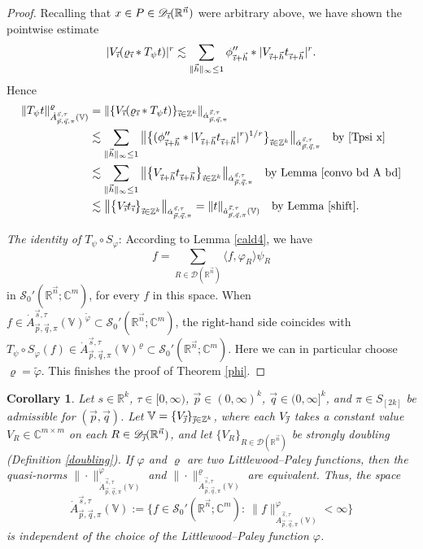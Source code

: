 \documentclass[11pt, reqno]{amsart}
\newtheorem{corollary}[theorem]{Corollary}
\theoremstyle{definition}
\theoremstyle{remark}
\numberwithin{equation}{section}
\newcommand{\C}{\mathbb C}
\newcommand{\D}{\mathscr D}
\newcommand{\R}{\mathbb R}
\newcommand{\Sc}{\mathscr S}
\newcommand{\V}{\mathbb V}
\newcommand{\Z}{\mathbb Z}
\newcommand{\vh}{\vec h}
\newcommand{\vi}{\vec{\textit{\i}}}
\newcommand{\vj}{\vec{\textit{\j}}}
\newcommand{\vn}{\vec n}
\newcommand{\vp}{\vec p}
\newcommand{\vq}{\vec q}
\newcommand{\vs}{\vec s}
\newcommand{\Atau}{\dot A^{\vs,\tau}_{\vp,\vq,\pi}}
\newcommand{\atau}{\dot a^{\vs,\tau}_{\vp,\vq,\pi}}
\newcommand{\aatau}{\dot{\alpha}^{\vs,\tau}_{\vp,\vq,\pi}}
\newcommand{\pair}[2]{\langle #1, #2 \rangle}
\newcommand{\abs}[1]{|#1|}
\newcommand{\Norm}[2]{\|#1\|_{#2}}
\newcommand{\bNorm}[2]{\big\|#1\big\|_{#2}}
\begin{document}
\begin{proof}
Recalling that $x\in P\in\D_{\vi}(\R^{\vn})$ were arbitrary above, we have shown the pointwise estimate
\begin{equation}\label{Tpsi x}
\abs{V_{\vi}(\varrho_{\vi}*T_\psi t)}^r
\lesssim\sum_{\Norm{\vh}{\infty}\leq 1}\phi_{\vi+\vh}''*\abs{V_{\vi+\vh}t_{\vi+\vh}}^r.
\end{equation}
Hence
\begin{align*}
\Norm{T_\psi t}{\Atau(\V)}^{\varrho}
&=\Norm{\{V_{\vi}(\varrho_{\vi}*T_\psi t)\}_{\vi\in\Z^k}}{\aatau} \\
&\lesssim \sum_{\Norm{\vh}{\infty}\leq 1} \bNorm{\big\{(\phi_{\vi+\vh}''*\abs{V_{\vi+\vh}t_{\vi+\vh}}^r)^{1/r}\big\}_{\vi\in\Z^k}}{\aatau}
\quad\text{by \eqref{Tpsi x}} \\
&\lesssim \sum_{\Norm{\vh}{\infty}\leq 1} \bNorm{\big\{V_{\vi+\vh}t_{\vi+\vh}\big\}_{\vi\in\Z^k}}{\aatau}
\quad\text{by Lemma \ref{convo bd A bd}} \\
&\lesssim \bNorm{\big\{V_{\vi}t_{\vi}\big\}_{\vi\in\Z^k}}{\aatau}=\Norm{t}{\atau(\V)}\quad\text{by Lemma \ref{shift}.}
\end{align*}

\textit{The identity of $T_\psi\circ S_\varphi$}: According to Lemma \ref{cald4}, we have
\begin{equation*}
f=\sum_{R\in\D(\mathbb R^{\vec n})}\pair{f}{\varphi_R}\psi_R
\end{equation*}
in $\Sc_0'(\R^{\vn};\C^m)$, for every $f$ in this space. When $f\in\Atau(\V)^{\tilde\varphi}\subset\Sc_0'(\R^{\vn};\C^m)$, the right-hand side coincides with $T_\psi\circ S_\varphi(f)\in\Atau(\V)^{\varrho}\subset\Sc_0'(\R^{\vn};\C^m)$. Here we can in particular choose $\varrho=\widetilde\varphi$.
This finishes the proof of Theorem \ref{phi}.
\end{proof}

\begin{corollary}\label{38}
Let $s\in\R^k$, $\tau\in[0,\infty)$, $\vp\in(0,\infty)^k$, $\vq\in(0,\infty]^k$, and $\pi\in S_{[2k]}$ be admissible for $(\vp,\vq)$.
Let $\V=\{V_{\vj}\}_{\vj\in\Z^k}$, where each $V_{\vj}$ takes a constant value $V_R\in\C^{m\times m}$ on each $R\in\D_{\vj}(\R^{\vn})$, and let $\{V_R\}_{R\in\D(\R^{\vn})}$ be strongly doubling (Definition \ref{doubling}).
If $\varphi$ and $\varrho$ are two Littlewood--Paley functions,
then the quasi-norms $\Norm{\cdot }{\Atau(\V)}^{\varphi}$
and $\Norm{\cdot}{\Atau(\V)}^{\varrho}$ are equivalent. Thus, the space
\begin{equation*}
\Atau(\V):=\Big\{f\in\Sc_0'(\R^{\vn};\C^m):\
\Norm{f}{\Atau(\V)}^{\varphi}<\infty\Big\}
\end{equation*}
is independent of the choice of the Littlewood--Paley function $\varphi$.
\end{corollary}
\end{document}
